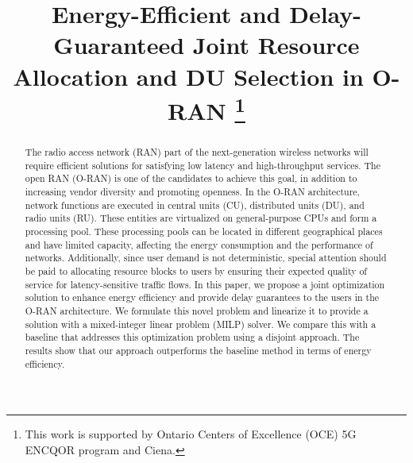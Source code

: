 \documentclass[conference]{IEEEtran}
\begin{document}
\title{Energy-Efficient and Delay-Guaranteed Joint Resource Allocation and DU Selection in O-RAN {
\thanks{This work is supported by Ontario Centers of Excellence
(OCE) 5G ENCQOR program and Ciena.}
}}
\author{
}
\maketitle
\makeatletter
\def\ps@IEEEtitlepagestyle{%
  \def\@oddfoot{\mycopyrightnotice}%
  \def\@oddhead{\hbox{}\@IEEEheaderstyle\leftmark\hfil\thepage}\relax
  \def\@evenhead{\@IEEEheaderstyle\thepage\hfil\leftmark\hbox{}}\relax
  \def\@evenfoot{}%
}
\def\mycopyrightnotice{%
  \begin{minipage}{\textwidth}
  \centering \scriptsize
Accepted Paper (DOI: 10.1109/5GWF52925.2021.00025). IEEE policy provides that authors are free to follow funder public access mandates to post accepted articles in repositories. When posting in a repository, the IEEE embargo period is 24 months. However, IEEE recognizes that posting requirements and embargo periods vary by funder. IEEE authors may comply with requirements to deposit their accepted manuscripts in a repository per funder requirements where the embargo is less than 24 months.
  \end{minipage}
}
\makeatother

\begin{abstract}
The radio access network (RAN) part of the next-generation wireless networks will require efficient solutions for satisfying low latency and high-throughput services. The open RAN (O-RAN) is one of the candidates to achieve this goal, in addition to increasing vendor diversity and promoting openness. In the O-RAN architecture, network functions are executed in central units (CU), distributed units (DU), and radio units (RU). These entities are virtualized on general-purpose CPUs and form a processing pool. These processing pools can be located in different geographical places and have limited capacity, affecting the energy consumption and the performance of networks. Additionally, since user demand is not deterministic, special attention should be paid to allocating resource blocks to users by ensuring their expected quality of service for latency-sensitive traffic flows. In this paper, we propose a joint optimization solution to enhance energy efficiency and provide delay guarantees to the users in the O-RAN architecture. We formulate this novel problem and linearize it to provide a solution with a mixed-integer linear problem (MILP) solver. We compare this with a baseline that addresses this optimization problem using a disjoint approach. The results show that our approach outperforms the baseline method in terms of energy efficiency.

\end{abstract}
\end{document}
